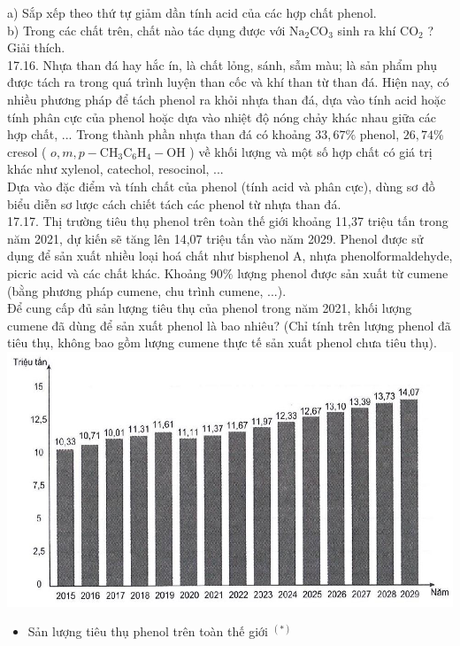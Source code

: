 \documentclass[10pt]{article}
\begin{document}
a) Sắp xếp theo thứ tự giảm dần tính acid của các hợp chất phenol.\\
b) Trong các chất trên, chất nào tác dụng được với $\mathrm{Na}_{2} \mathrm{CO}_{3}$ sinh ra khí $\mathrm{CO}_{2}$ ? Giải thích.\\
17.16. Nhựa than đá hay hắc ín, là chất lỏng, sánh, sẫm màu; là sản phẩm phụ được tách ra trong quá trình luyện than cốc và khí than từ than đá. Hiện nay, có nhiều phương pháp để tách phenol ra khỏi nhựa than đá, dựa vào tính acid hoặc tính phân cực của phenol hoặc dựa vào nhiệt độ nóng chảy khác nhau giữa các hợp chất, ... Trong thành phần nhựa than đá có khoảng $33,67 \%$ phenol, $26,74 \%$ cresol ( $o, m, p-\mathrm{CH}_{3} \mathrm{C}_{6} \mathrm{H}_{4}-\mathrm{OH}$ ) về khối lượng và một số hợp chất có giá trị khác như xylenol, catechol, resocinol, ...\\
Dựa vào đặc điểm và tính chất của phenol (tính acid và phân cực), dùng sơ đồ biểu diễn sơ lược cách chiết tách các phenol từ nhựa than đá.\\
17.17. Thị trường tiêu thụ phenol trên toàn thế giới khoảng 11,37 triệu tấn trong năm 2021, dự kiến sẽ tăng lên 14,07 triệu tấn vào năm 2029. Phenol được sử dụng để sản xuất nhiều loại hoá chất như bisphenol A, nhựa phenolformaldehyde, picric acid và các chất khác. Khoảng $90 \%$ lượng phenol được sản xuất từ cumene (bằng phương pháp cumene, chu trình cumene, ...).\\
Để cung cấp đủ sản lượng tiêu thụ của phenol trong năm 2021, khối lượng cumene đã dùng để sản xuất phenol là bao nhiêu? (Chỉ tính trên lượng phenol đã tiêu thụ, không bao gồm lượng cumene thực tế sản xuất phenol chưa tiêu thụ).\\
\includegraphics[max width=\textwidth, center]{2025_10_23_ae7aef68fb3b41082d29g-41}

\begin{itemize}
  \item Sản lượng tiêu thụ phenol trên toàn thế giới ${ }^{(*)}$
\end{itemize}
\end{document}
